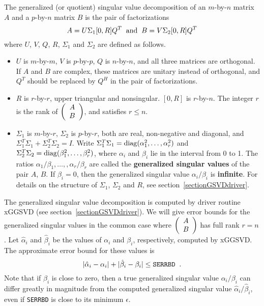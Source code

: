 The generalized (or quotient) singular value decomposition
of an $m$-by-$n$ matrix
$A$ and a $p$-by-$n$ matrix $B$ is the pair of factorizations
\[
A = U \Sigma_1 [0,R] Q^T \; \; {\rm and} \; \;
B = V \Sigma_2 [0,R] Q^T
\]
where $U$, $V$, $Q$, $R$, $\Sigma_1$ and $\Sigma_2$ are defined
as follows.
\begin{itemize}
\item $U$ is $m$-by-$m$, $V$ is $p$-by-$p$, $Q$ is $n$-by-$n$,
and all three matrices are orthogonal.  If $A$ and
$B$ are complex, these matrices are unitary instead
of orthogonal, and $Q^T$ should be
replaced by $Q^H$ in the pair of factorizations.
\item $R$ is $r$-by-$r$, upper triangular and nonsingular.
$[0,R]$ is $r$-by-$n$. The integer $r$ is the rank of
$\bmat{c} A \\ B \emat$, and satisfies $r \leq n$.
\item $\Sigma_1$ is $m$-by-$r$,
$\Sigma_2$ is $p$-by-$r$, both are real, non-negative and diagonal,
and $\Sigma_1^T \Sigma_1 + \Sigma_2^T \Sigma_2 = I$.
Write
$\Sigma_1^T \Sigma_1 = {\rm diag} ( \alpha_1^2 , \ldots , \alpha_r^2 )$ and
$\Sigma_2^T \Sigma_2 = {\rm diag} ( \beta_1^2 , \ldots , \beta_r^2 )$,
where $\alpha_i$ and $\beta_i$ lie in the interval from 0 to 1.
The ratios
$\alpha_1 / \beta_1 , \ldots,,  \alpha_r / \beta_r$
are called the {\bf generalized singular values} of the pair $A$, $B$.
If $\beta_i = 0$, then the generalized singular value
$\alpha_i / \beta_i$ is {\bf infinite}.
For details on the structure of $\Sigma_1$, $\Sigma_2$ and $R$, see
section~\ref{sectionGSVDdriver}.
\end{itemize}

The generalized singular value decomposition is
computed by driver routine xGGSVD (see section~\ref{sectionGSVDdriver}).
We will give error bounds for the generalized
singular values in the
common case where $\bmat{c} A \\ B \emat$ has full
rank $r=n$.
Let $\hat{\alpha}_i$ and $\hat{\beta}_i$
be the values of $\alpha_i$ and $\beta_i$, respectively,
computed by xGGSVD.
The approximate error
bound
for these values is
\[
| \hat{\alpha}_i - \alpha_i | +
| \hat{\beta}_i - \beta_i |  \leq {\tt SERRBD} \; \; .
\]
Note that if $\beta_i$ is close to zero, then a true
generalized singular value
$\alpha_i / \beta_i$ can differ greatly in magnitude from
the computed generalized singular value
$\hat{\alpha}_i / \hat{\beta}_i$, even if {\tt SERRBD} is
close to its minimum $\epsilon$.


